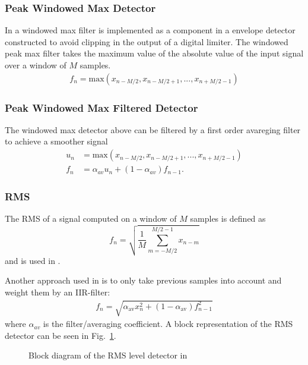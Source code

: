 \documentclass[../main2.tex]{subfiles}
\providecommand{\rootdir}{..}
\begin{document}
\subsubsection{Peak Windowed Max Detector}
In \cite{hamalainen2002smoothing} a windowed max filter is implemented as a component in a envelope detector constructed to avoid clipping in the output of a digital limiter. The windowed peak max filter takes the maximum value of the absolute value of the input signal over a window of $M$ samples.
\begin{align}
f_n = \text{max}(x_{n-M/2},x_{n-M/2+1},..., x_{n+M/2-1})
\end{align}
\subsubsection{Peak Windowed Max Filtered Detector}
The windowed max detector above can be filtered by a first order avareging filter to achieve a smoother signal
\begin{align}
u_n &= \text{max}(x_{n-M/2},x_{n-M/2+1},..., x_{n+M/2-1}) \\
f_n &= \alpha_{av} u_n + (1-\alpha_{av})f_{n-1}.
\end{align}

\subsubsection{RMS}
The RMS of a signal computed on a window of $M$ samples is defined as
\begin{equation}
f_n = \sqrt{ \frac{1}{M} \sum_{m=-M/2}^{M/2-1} x_{n-m}}
\end{equation}
and is used in \cite{reiss2010rev}\cite{bosi1991low}.

Another approach used in \cite{mcnally1984dynamic} is to only take previous samples into account and weight them by an IIR-filter:
\begin{align*}
f_n = \sqrt{\alpha_{\text{av}} x_{n}^2+ (1-\alpha_{\text{av}}) f_{n-1}^2}
\end{align*}
where $\alpha_{av}$ is the filter/averaging coefficient. A block representation of the RMS detector can be seen in Fig.~\ref{fig:block_mcnally_theory_rms}.%
\begin{figure}[h]
\centerline{}
\caption{Block diagram of the RMS level detector in \cite{mcnally1984dynamic}}
\label{fig:block_mcnally_theory_rms}
\end{figure}
\end{document}
